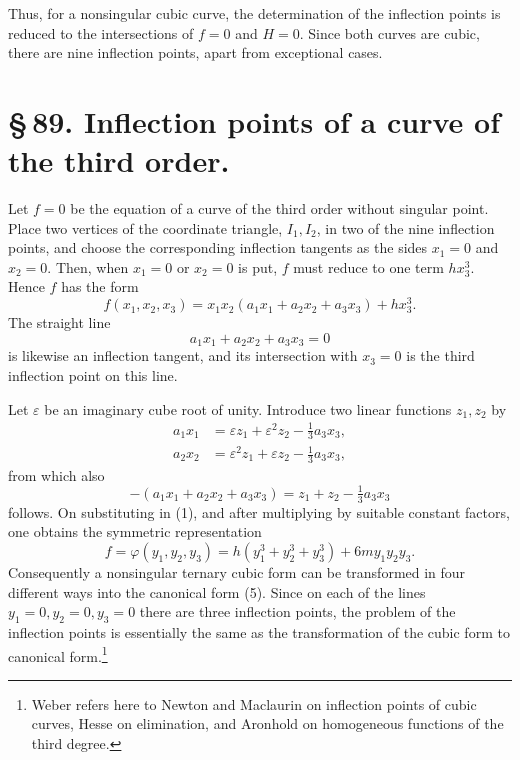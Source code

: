 \documentclass[11pt]{article}
\begin{document}
Thus, for a nonsingular cubic curve, the determination of the inflection points is reduced to the intersections of $f=0$ and $H=0$. Since both curves are cubic, there are nine inflection points, apart from exceptional cases.

\section*{\S\,89. Inflection points of a curve of the third order.}

Let $f=0$ be the equation of a curve of the third order without singular point. Place two vertices of the coordinate triangle, $I_1,I_2$, in two of the nine inflection points, and choose the corresponding inflection tangents as the sides $x_1=0$ and $x_2=0$. Then, when $x_1=0$ or $x_2=0$ is put, $f$ must reduce to one term $hx_3^3$. Hence $f$ has the form
\begin{equation}
 f(x_1,x_2,x_3)=x_1x_2(a_1x_1+a_2x_2+a_3x_3)+hx_3^3.
 \tag{1}
\end{equation}
The straight line
\begin{equation}
 a_1x_1+a_2x_2+a_3x_3=0
 \tag{2}
\end{equation}
is likewise an inflection tangent, and its intersection with $x_3=0$ is the third inflection point on this line.

Let $\varepsilon$ be an imaginary cube root of unity. Introduce two linear functions $z_1,z_2$ by
\begin{equation}
\begin{aligned}
 a_1x_1&=\varepsilon z_1+\varepsilon^2z_2-\tfrac13a_3x_3,\\
 a_2x_2&=\varepsilon^2z_1+\varepsilon z_2-\tfrac13a_3x_3,
\end{aligned}
\tag{3}
\end{equation}
from which also
\begin{equation}
 -(a_1x_1+a_2x_2+a_3x_3)=z_1+z_2-\tfrac13a_3x_3
 \tag{4}
\end{equation}
follows. On substituting in (1), and after multiplying by suitable constant factors, one obtains the symmetric representation
\begin{equation}
 f=\varphi(y_1,y_2,y_3)=h(y_1^3+y_2^3+y_3^3)+6my_1y_2y_3.
 \tag{5}
\end{equation}
Consequently a nonsingular ternary cubic form can be transformed in four different ways into the canonical form (5). Since on each of the lines $y_1=0,y_2=0,y_3=0$ there are three inflection points, the problem of the inflection points is essentially the same as the transformation of the cubic form to canonical form.\footnote{Weber refers here to Newton and Maclaurin on inflection points of cubic curves, Hesse on elimination, and Aronhold on homogeneous functions of the third degree.}
\end{document}
